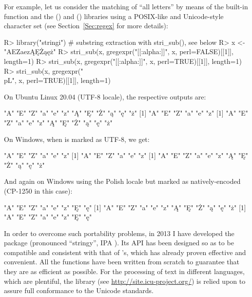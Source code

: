 \documentclass[nojss]{jss}
\begin{document}
For example, let us consider the matching
of ``all letters'' by means of the built-in  function
and the  ()
and  () libraries
using a POSIX-like and Unicode-style character set
(see Section~\ref{Sec:regex} for more details):

\begin{Schunk}
\begin{Sinput}
R> library("stringi")  # substring extraction with stri_sub(), see below
R> x <- "AEZaezĄĘŻąęż"
R> stri_sub(x, gregexpr("[[:alpha:]]", x, perl=FALSE)[[1]], length=1)
R> stri_sub(x, gregexpr("[[:alpha:]]", x, perl=TRUE)[[1]],  length=1)
R> stri_sub(x, gregexpr("\\p{L}", x, perl=TRUE)[[1]],       length=1)
\end{Sinput}
\end{Schunk}

On Ubuntu Linux 20.04 (UTF-8 locale), the respective outputs are:

\begin{Schunk}
\begin{Soutput}
[1] "A" "E" "Z" "a" "e" "z" "Ą" "Ę" "Ż" "ą" "ę" "ż"
[1] "A" "E" "Z" "a" "e" "z"
[1] "A" "E" "Z" "a" "e" "z" "Ą" "Ę" "Ż" "ą" "ę" "ż"
\end{Soutput}
\end{Schunk}

On Windows, when  is marked as UTF-8, we get:

\begin{Schunk}
\begin{Soutput}
[1] "A" "E" "Z" "a" "e" "z"
[1] "A" "E" "Z" "a" "e" "z"
[1] "A" "E" "Z" "a" "e" "z" "Ą" "Ę" "Ż" "ą" "ę" "ż"
\end{Soutput}
\end{Schunk}

And again on Windows using the Polish locale
but  marked as natively-encoded (CP-1250 in this case):

\begin{Schunk}
\begin{Soutput}
[1] "A" "E" "Z" "a" "e" "z" "Ę" "ę"
[1] "A" "E" "Z" "a" "e" "z" "Ą" "Ę" "Ż" "ą" "ę" "ż"
[1] "A" "E" "Z" "a" "e" "z" "Ę" "ę"
\end{Soutput}
\end{Schunk}



In order to overcome such portability problems, in 2013 I have developed
the  package (pronounced ``stringy'', IPA \textipa{[{stringi}]}).
Its API has been designed so as to be compatible and consistent with that
of 's, which has already proven effective and convenient.
All the functions have been written from scratch to
guarantee that they are as efficient as possible.
For the processing of text in different languages,
which are plentiful, the  library
(see \url{http://site.icu-project.org/}) is relied upon to assure
full conformance to the Unicode standards.
\end{document}
